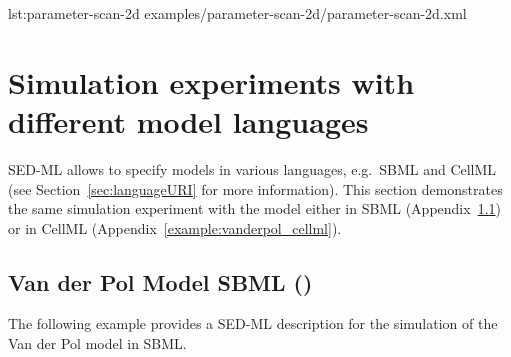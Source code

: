 {lst:parameter-scan-2d}
{examples/parameter-scan-2d/parameter-scan-2d.xml}

\section{Simulation experiments with different model languages}
SED-ML allows to specify models in various languages, e.g.\ SBML and CellML (see Section~\ref{sec:languageURI} for more information). This section demonstrates the same simulation experiment with the model either in SBML (Appendix~\ref{example:vanderpol_sbml}) or in CellML (Appendix~\ref{example:vanderpol_cellml}).

\subsection{Van der Pol Model SBML ()}
\label{example:vanderpol_sbml}
The following example provides a SED-ML description for the simulation of the Van der Pol model in SBML.

